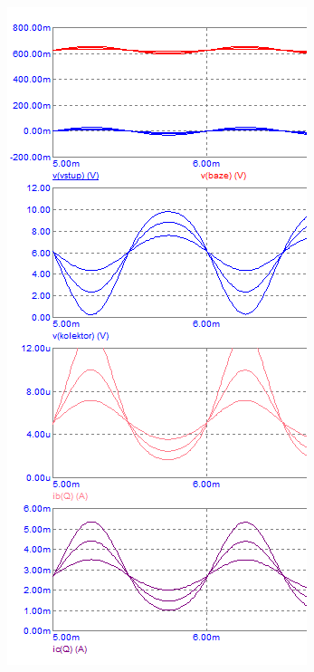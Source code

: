 \documentclass{article}
\begin{document}
\begin{figure}[H]
	\begin{minipage}[t]{0.471\textwidth}
    \begin{figure}[H]
      \includegraphics[width=\textwidth]{PC/BJT/Tranzient_analyza_3.png}

\end{figure}
\end{minipage}
\end{figure}
\end{document}
